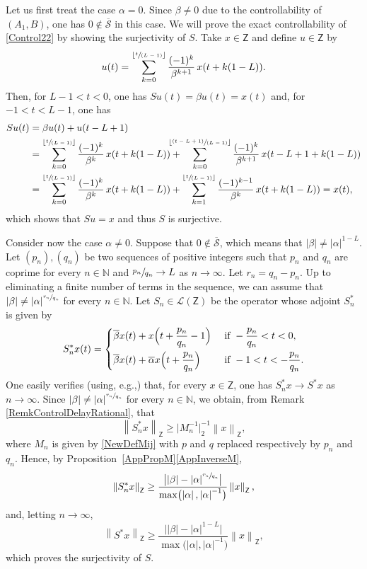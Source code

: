 \documentclass[10pt]{amsart}
\providecommand{\eg}{}
\newcommand{\spfrac}[2]{\sfrac{#1}{(#2)}}
\newcommand{\pspfrac}[2]{\sfrac{(#1)}{(#2)}}
\renewcommand{\eg}{e.g.,\xspace}
\theoremstyle{plain}
\theoremstyle{definition}
\newcommand{\norm}[1]{\left\lVert #1\right\lVert}
\newcommand{\abs}[1]{\left\lvert #1\right \rvert}
\newcommand{\floor}[1]{\left\lfloor #1 \right\rfloor}
\newcommand{\babs}[1]{\bigl\lvert #1\bigr \rvert}
\newcommand{\nabs}[1]{\lvert #1 \rvert}
\begin{document}
Let us first treat the case $\alpha = 0$. Since $\beta \neq 0$ due to the controllability of $(A_1, B)$, one has $0 \notin \overline{\mathcal S}$ in this case. We will prove the exact controllability of \eqref{Control22} by showing the surjectivity of $S$. Take $x \in \mathsf Z$ and define $u \in \mathsf Z$ by
\[u(t) = \sum_{k=0}^{\floor{\spfrac{t}{L - 1}}} \frac{(-1)^k}{\beta^{k+1}}\, x(t + k(1 - L)).\]
Then, for $L - 1 < t < 0$, one has $S u(t) = \beta u(t) = x(t)$ and, for $-1 < t < L-1$, one has
\begin{align*}
S u(t) & = \beta u(t) + u(t - L + 1)  \\
& = \sum_{k=0}^{\floor{\spfrac{t}{L - 1}}} \frac{(-1)^k}{\beta^{k}}\, x(t + k(1 - L)) +\hspace*{-5mm} \sum_{k=0}^{\floor{\pspfrac{t - L + 1}{L - 1}}} \frac{(-1)^k}{\beta^{k+1}}\, x(t - L + 1 + k(1 - L))  \\
& = \sum_{k=0}^{\floor{\spfrac{t}{L - 1}}} \frac{(-1)^k}{\beta^{k}}\, x(t + k(1 - L)) + \sum_{k=1}^{\floor{\spfrac{t}{L - 1}}} \frac{(-1)^{k-1}}{\beta^{k}}\, x(t + k(1 - L)) = x(t),
\end{align*}
which shows that $S u = x$ and thus $S$ is surjective.

Consider now the case $\alpha \neq 0$. Suppose that $0 \notin \overline{\mathcal S}$, which means that $\abs{\beta} \neq \abs{\alpha}^{1-L}$. Let $(p_n), (q_n)$ be two sequences of positive integers such that $p_n$ and $q_n$ are coprime for every $n \in \mathbb N$ and $\sfrac{p_n}{q_n} \to L$ as $n \to \infty$. Let $r_n = q_n - p_n$. Up to eliminating a finite number of terms in the sequence, we can assume that $\abs{\beta} \neq \abs{\alpha}^{\sfrac{r_n}{q_n}}$ for every $n \in \mathbb N$. Let $S_n \in \mathcal L(\mathsf Z)$ be the operator whose adjoint $S_n^\ast$ is given by
\begin{equation*}
S_n^\ast x(t) =
\begin{dcases}
\overline\beta x(t) + x\Bigl(t + \frac{p_n}{q_n} - 1\Bigr) & \text{ if } -\frac{p_n}{q_n} < t < 0, \\
\overline\beta x(t) + \overline\alpha x\Bigl(t + \frac{p_n}{q_n}\Bigr) & \text{ if } -1 < t < -\frac{p_n}{q_n}.
\end{dcases}
\end{equation*}
One easily verifies (using, \eg \cite[Th.\,9.5]{Rudin1987Real}) that, for every $x \in \mathsf Z$, one has $S_n^\ast x \to S^\ast x$ as $n \to \infty$. Since $\abs{\beta} \neq \abs{\alpha}^{\sfrac{r_n}{q_n}}$ for every $n \in \mathbb N$, we obtain, from Remark \ref{RemkControlDelayRational}, that
\[\norm{S_n^\ast x}_{\mathsf Z} \geq \nabs{M_n^{-1}}_{2}^{-1} \norm{x}_{\mathsf Z},\]
where $M_n$ is given by \eqref{NewDefMij} with $p$ and $q$ replaced respectively by $p_n$ and $q_n$. Hence, by Proposition~\ref{AppPropM}\eqref{AppInverseM},
\[\norm{S_n^\ast x}_{\mathsf Z} \geq \frac{\babs{\abs{\beta} - \abs{\alpha}^{\sfrac{r_n}{q_n}}}}{\max\bigl(\abs{\alpha}, \abs{\alpha}^{-1}\bigr)} \norm{x}_{\mathsf Z},\]
and, letting $n \to \infty$,
\[\norm{S^\ast x}_{\mathsf Z} \geq \frac{\babs{\abs{\beta} - \abs{\alpha}^{1-L}}}{\max\bigl(\abs{\alpha}, \abs{\alpha}^{-1}\bigr)} \norm{x}_{\mathsf Z},\]
which proves the surjectivity of $S$.
\end{document}
